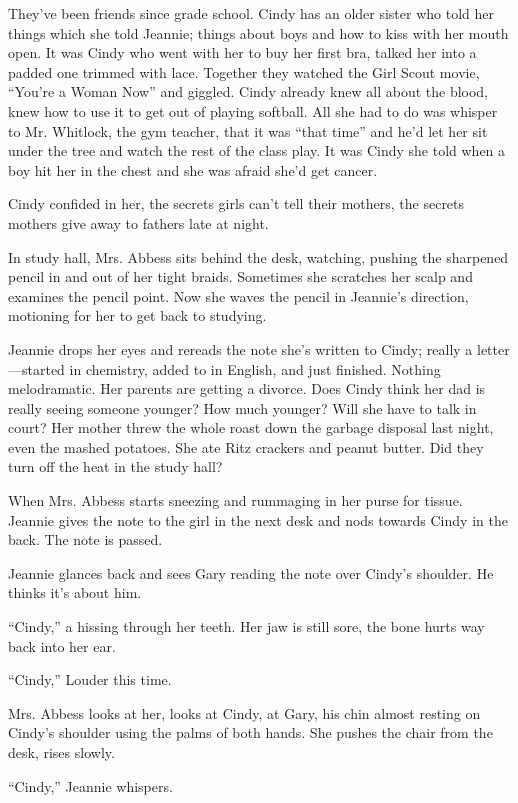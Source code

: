 \documentclass[
]{article}
\begin{document}
They've been friends since grade school. Cindy has an older sister who
told her things which she told Jeannie; things about boys and how to
kiss with her mouth open. It was Cindy who went with her to buy her
first bra, talked her into a padded one trimmed with lace. Together they
watched the Girl Scout movie, ``You're a Woman Now'' and giggled. Cindy
already knew all about the blood, knew how to use it to get out of
playing softball. All she had to do was whisper to Mr. Whitlock, the gym
teacher, that it was ``that time'' and he'd let her sit under the tree
and watch the rest of the class play. It was Cindy she told when a boy
hit her in the chest and she was afraid she'd get cancer.

Cindy confided in her, the secrets girls can't tell their mothers, the
secrets mothers give away to fathers late at night.

In study hall, Mrs. Abbess sits behind the desk, watching, pushing the
sharpened pencil in and out of her tight braids. Sometimes she scratches
her scalp and examines the pencil point. Now she waves the pencil in
Jeannie's direction, motioning for her to get back to studying.

Jeannie drops her eyes and rereads the note she's written to Cindy;
really a letter---started in chemistry, added to in English, and just
finished. Nothing melodramatic. Her parents are getting a divorce. Does
Cindy think her dad is really seeing someone younger? How much younger?
Will she have to talk in court? Her mother threw the whole roast down
the garbage disposal last night, even the mashed potatoes. She ate Ritz
crackers and peanut butter. Did they turn off the heat in the study
hall?

When Mrs. Abbess starts sneezing and rummaging in her purse for tissue.
Jeannie gives the note to the girl in the next desk and nods towards
Cindy in the back. The note is passed.

Jeannie glances back and sees Gary reading the note over Cindy's
shoulder. He thinks it's about him.

``Cindy,'' a hissing through her teeth. Her jaw is still sore, the bone
hurts way back into her ear.

``Cindy,'' Louder this time.

Mrs. Abbess looks at her, looks at Cindy, at Gary, his chin almost
resting on Cindy's shoulder using the palms of both hands. She pushes
the chair from the desk, rises slowly.

``Cindy,'' Jeannie whispers.
\end{document}
